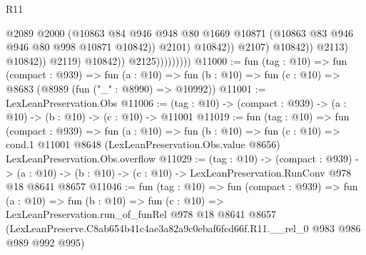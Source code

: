 \begin{lexlean}{R11}
\begin{coremodule}
                                              @2089
                                              @2000
                                              (@10863
                                                @84
                                                @946
                                                @948
                                                @80
                                                @1669
                                                @10871
                                                (@10863 @83 @946 @946 @80 @998 @10871 @10842))
                                              @2101)
                                            @10842))
                                        @2107)
                                      @10842))
                                  @2113)
                                @10842))
                            @2119)
                          @10842))
                      @2125)))))))))
@11000 := fun (tag : @10) =>
  fun (compact : @939) =>
  fun (a : @10) => fun (b : @10) => fun (c : @10) => @8683 (@8989 (fun ("_" : @8990) => @10992))
@11001 := LexLeanPreservation.Obs
@11006 := (tag : @10) -> (compact : @939) -> (a : @10) -> (b : @10) -> (c : @10) -> @11001
@11019 := fun (tag : @10) =>
  fun (compact : @939) =>
  fun (a : @10) =>
  fun (b : @10) =>
  fun (c : @10) =>
  cond.{1} @11001 @8648 (LexLeanPreservation.Obs.value @8656) LexLeanPreservation.Obs.overflow
@11029 := (tag : @10) ->
  (compact : @939) ->
  (a : @10) -> (b : @10) -> (c : @10) -> LexLeanPreservation.RunConv @978 @18 @8641 @8657
@11046 := fun (tag : @10) =>
  fun (compact : @939) =>
  fun (a : @10) =>
  fun (b : @10) =>
  fun (c : @10) =>
  LexLeanPreservation.run_of_funRel
    @978
    @18
    @8641
    @8657
    (LexLeanPreserve.C8ab654b41c4ae3a82a9c0ebaf6fcd66f.R11.__rel_0 @983 @986 @989 @992 @995)
\end{coremodule}
\end{lexlean}
